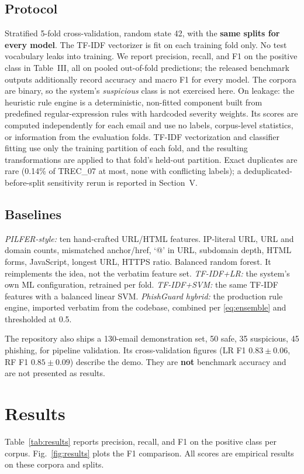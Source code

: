 \documentclass[conference]{IEEEtran}
\begin{document}
\subsection{Protocol}
Stratified 5-fold cross-validation, random state 42, with the \textbf{same
splits for every model}. The TF-IDF vectorizer is fit on each training fold
only. No test vocabulary leaks into training. We report precision,
recall, and F1 on the positive class in Table~III, all on pooled
out-of-fold predictions; the released benchmark outputs additionally record
accuracy and macro F1 for every model. The corpora are binary, so the system's
\textit{suspicious} class is not exercised here. On leakage: the heuristic
rule engine is a deterministic, non-fitted component built from predefined
regular-expression rules with hardcoded severity weights. Its scores are
computed independently for each email and use no labels, corpus-level
statistics, or information from the evaluation folds. TF-IDF vectorization
and classifier fitting use only the training partition of each fold, and the
resulting transformations are applied to that fold's held-out partition.
Exact duplicates are rare
(0.14\% of TREC\_07 at most, none with conflicting labels); a
deduplicated-before-split sensitivity rerun is reported in Section~V.

\subsection{Baselines}
\textit{PILFER-style:} ten hand-crafted URL/HTML features. IP-literal URL,
URL and domain counts, mismatched anchor/href, `@' in URL, subdomain depth,
HTML forms, JavaScript, longest URL, HTTPS ratio. Balanced random forest. It
reimplements the \cite{pilfer} idea, not the verbatim feature set.
\textit{TF-IDF+LR:} the system's own ML configuration, retrained per fold.
\textit{TF-IDF+SVM:} the same TF-IDF features with a balanced linear SVM.
\textit{PhishGuard hybrid:} the production rule engine, imported verbatim
from the codebase, combined per \eqref{eq:ensemble} and thresholded at 0.5.

The repository also ships a 130-email demonstration set, 50 safe, 35
suspicious, 45 phishing, for pipeline validation. Its cross-validation
figures (LR F1 $0.83 \pm 0.06$, RF F1 $0.85 \pm 0.09$) describe the demo.
They are \textbf{not} benchmark accuracy and are not presented as results.

\section{Results}
Table~\ref{tab:results} reports precision, recall, and F1 on the positive
class per corpus. Fig.~\ref{fig:results} plots the F1 comparison. All scores
are empirical results on these corpora and splits.
\end{document}
